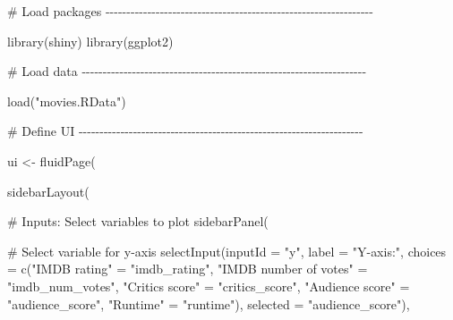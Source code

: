 \documentclass[
  letterpaper,
  DIV=11,
  numbers=noendperiod]{scrreprt}
\newenvironment{Shaded}{\begin{snugshade}}{\end{snugshade}}
\newcommand{\AttributeTok}[1]{\textcolor[rgb]{0.40,0.46,0.14}{#1}}
\newcommand{\CommentTok}[1]{\textcolor[rgb]{0.37,0.37,0.37}{#1}}
\newcommand{\FunctionTok}[1]{\textcolor[rgb]{0.28,0.35,0.67}{#1}}
\newcommand{\NormalTok}[1]{\textcolor[rgb]{0.00,0.46,0.62}{#1}}
\newcommand{\OtherTok}[1]{\textcolor[rgb]{0.00,0.46,0.62}{#1}}
\newcommand{\StringTok}[1]{\textcolor[rgb]{0.13,0.47,0.30}{#1}}
\begin{document}
\begin{Shaded}
\begin{Highlighting}[]
\CommentTok{\# Load packages {-}{-}{-}{-}{-}{-}{-}{-}{-}{-}{-}{-}{-}{-}{-}{-}{-}{-}{-}{-}{-}{-}{-}{-}{-}{-}{-}{-}{-}{-}{-}{-}{-}{-}{-}{-}{-}{-}{-}{-}{-}{-}{-}{-}{-}{-}{-}{-}{-}{-}{-}{-}{-}{-}{-}{-}{-}{-}{-}{-}{-}{-}{-}{-}}

\FunctionTok{library}\NormalTok{(shiny)}
\FunctionTok{library}\NormalTok{(ggplot2)}

\CommentTok{\# Load data {-}{-}{-}{-}{-}{-}{-}{-}{-}{-}{-}{-}{-}{-}{-}{-}{-}{-}{-}{-}{-}{-}{-}{-}{-}{-}{-}{-}{-}{-}{-}{-}{-}{-}{-}{-}{-}{-}{-}{-}{-}{-}{-}{-}{-}{-}{-}{-}{-}{-}{-}{-}{-}{-}{-}{-}{-}{-}{-}{-}{-}{-}{-}{-}{-}{-}{-}{-}}

\FunctionTok{load}\NormalTok{(}\StringTok{"movies.RData"}\NormalTok{)}

\CommentTok{\# Define UI {-}{-}{-}{-}{-}{-}{-}{-}{-}{-}{-}{-}{-}{-}{-}{-}{-}{-}{-}{-}{-}{-}{-}{-}{-}{-}{-}{-}{-}{-}{-}{-}{-}{-}{-}{-}{-}{-}{-}{-}{-}{-}{-}{-}{-}{-}{-}{-}{-}{-}{-}{-}{-}{-}{-}{-}{-}{-}{-}{-}{-}{-}{-}{-}{-}{-}{-}{-}}

\NormalTok{ui }\OtherTok{\textless{}{-}} \FunctionTok{fluidPage}\NormalTok{(}
  
  \FunctionTok{sidebarLayout}\NormalTok{(}
    
    \CommentTok{\# Inputs: Select variables to plot}
    \FunctionTok{sidebarPanel}\NormalTok{(}
      
      \CommentTok{\# Select variable for y{-}axis}
      \FunctionTok{selectInput}\NormalTok{(}\AttributeTok{inputId =} \StringTok{"y"}\NormalTok{, }
                  \AttributeTok{label =} \StringTok{"Y{-}axis:"}\NormalTok{,}
                  \AttributeTok{choices =} \FunctionTok{c}\NormalTok{(}\StringTok{"IMDB rating"}          \OtherTok{=} \StringTok{"imdb\_rating"}\NormalTok{, }
                              \StringTok{"IMDB number of votes"} \OtherTok{=} \StringTok{"imdb\_num\_votes"}\NormalTok{, }
                              \StringTok{"Critics score"}        \OtherTok{=} \StringTok{"critics\_score"}\NormalTok{, }
                              \StringTok{"Audience score"}       \OtherTok{=} \StringTok{"audience\_score"}\NormalTok{, }
                              \StringTok{"Runtime"}              \OtherTok{=} \StringTok{"runtime"}\NormalTok{), }
                  \AttributeTok{selected =} \StringTok{"audience\_score"}\NormalTok{),}
      

\end{Highlighting}
\end{Shaded}
\end{document}
